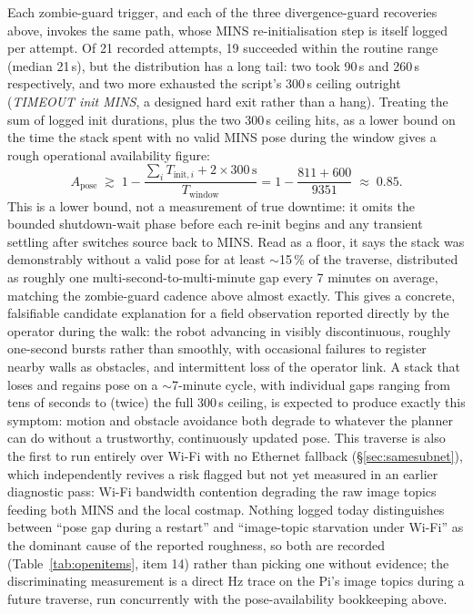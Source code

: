 Each zombie-guard trigger, and each of the three divergence-guard
recoveries above, invokes the same  path, whose
MINS re-initialisation step is itself logged per attempt. Of 21 recorded
attempts, 19 succeeded within the routine range (median 21\,s), but the
distribution has a long tail: two took 90\,s and 260\,s respectively, and
two more exhausted the script's 300\,s ceiling outright (\emph{TIMEOUT
init MINS}, a designed hard exit rather than a hang). Treating the sum of
logged init durations, plus the two 300\,s ceiling hits, as a lower bound
on the time the stack spent with no valid MINS pose during the window
gives a rough operational availability figure:
\begin{equation}
A_{\text{pose}} \;\gtrsim\; 1 - \frac{\sum_i T_{\text{init},i} + 2\times 300\,\text{s}}{T_{\text{window}}}
= 1 - \frac{811 + 600}{9351} \;\approx\; 0.85 .
\end{equation}
This is a lower bound, not a measurement of true downtime: it omits the
bounded shutdown-wait phase before each re-init begins and any transient
settling after  switches source back to MINS. Read
as a floor, it says the stack was demonstrably without a valid pose for
at least $\sim$15\,\% of the traverse, distributed as roughly one
multi-second-to-multi-minute gap every 7 minutes on average, matching the
zombie-guard cadence above almost exactly. This gives a concrete,
falsifiable candidate explanation for a field observation reported
directly by the operator during the walk: the robot advancing in
visibly discontinuous, roughly one-second bursts rather than smoothly,
with occasional failures to register nearby walls as obstacles, and
intermittent loss of the operator link. A stack that loses and regains
pose on a $\sim$7-minute cycle, with individual gaps ranging from
tens of seconds to (twice) the full 300\,s ceiling, is expected to
produce exactly this symptom: motion and obstacle avoidance both degrade
to whatever the planner can do without a trustworthy, continuously
updated pose. This traverse is also the first to run entirely over
Wi-Fi with no Ethernet fallback (\S\ref{sec:samesubnet}), which
independently revives a risk flagged but not yet measured in an earlier
diagnostic pass: Wi-Fi bandwidth contention degrading the raw image
topics feeding both MINS and the local costmap. Nothing logged today
distinguishes between ``pose gap during a restart'' and ``image-topic
starvation under Wi-Fi'' as the dominant cause of the reported roughness,
so both are recorded (Table~\ref{tab:openitems}, item 14) rather than
picking one without evidence; the discriminating measurement is a direct
Hz trace on the Pi's image topics during a future traverse, run
concurrently with the pose-availability bookkeeping above.

